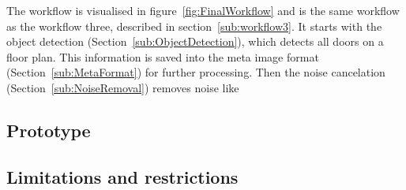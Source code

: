 The workflow is visualised in figure~\ref{fig:FinalWorkflow} and is the same workflow as the workflow three, described in section~\ref{sub:workflow3}. It starts with the object detection (Section~\ref{sub:ObjectDetection}), which detects all doors on a floor plan. This information is saved into the meta image format (Section~\ref{sub:MetaFormat}) for further processing. Then the noise cancelation (Section~\ref{sub:NoiseRemoval}) removes noise like 


\subsection{Prototype}

\subsection{Limitations and restrictions}
